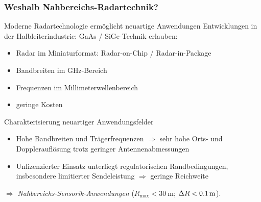 \documentclass[16pt]{beamer}
\begin{document}
\begin{frame}
\frametitle{Weshalb Nahbereichs-Radartechnik?} 
\begin{block}{Moderne Radartechnologie ermöglicht neuartige Anwendungen}
	Entwicklungen in der Halbleiterindustrie: GaAs / SiGe-Technik erlauben:
	\begin{itemize}
		\item Radar im Miniaturformat: Radar-on-Chip / Radar-in-Package 
		\item Bandbreiten im GHz-Bereich 
		\item Frequenzen im Millimeterwellenbereich 
		\item geringe Kosten
	\end{itemize}
\end{block}
\pause
\begin{block}{Charakterisierung neuartiger Anwendungsfelder}
	\begin{itemize}
		\item Hohe Bandbreiten und Trägerfrequenzen $\Rightarrow$ sehr hohe Orts- und Dopplerauflösung trotz geringer Antennenabmessungen
		\item Unlizenzierter Einsatz unterliegt regulatorischen Randbedingungen, insbesondere limitierter Sendeleistung $\Rightarrow$ geringe Reichweite 
	\end{itemize}
	$\Rightarrow$ \emph{Nahbereichs-Sensorik-Anwendungen} \hspace{0.3cm} ($R_{\mathrm{max}} < \SI{30}{\meter}$; $\Delta R < \SI{0{,}1}{\meter}$). 
\end{block}
\end{frame}
\end{document}
